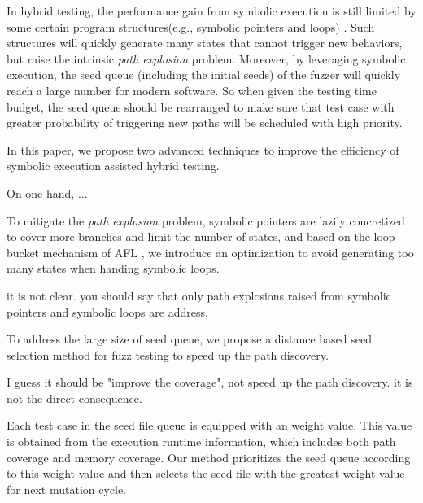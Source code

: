 {\color{blue}{1: explain that in hybrid testing, software is not taken as a gray box.
 2: explain what CGC is, give the full name. 3: are there some other hybrid testing? 
 why do you say symbolic execution assisted? 4: say that hybrid testing is a successful technqiue 
 that is used in practice, and this is witnessed by the tool Driller, also give the citation. } }

In hybrid testing, the performance gain from symbolic execution is still limited 
 by some certain program structures(e.g., symbolic pointers and loops) \cite{schwartz2010all, Boonstoppel:RAP, cadar2011symbolic, baldoni2016survey}. 
 Such structures will quickly generate many states that cannot trigger new behaviors,
 but raise the intrinsic \textit{path explosion} problem.
 Moreover, by leveraging symbolic execution, 
 the seed queue (including the initial seeds) of the fuzzer will quickly reach a large number for modern software. 
 So when given the testing time budget, the seed queue should be rearranged to make sure 
 that test case with greater probability of triggering new paths will be scheduled with high priority.


 In this paper, we propose two advanced techniques to improve the efficiency of symbolic execution assisted hybrid testing.

{\color{blue} {On one hand, ...}}

 To mitigate the \textit{path explosion} problem, symbolic pointers are lazily concretized to cover more branches and limit the number of states,
 and based on the loop bucket mechanism of AFL \cite{online:afl}, 
 we introduce an optimization to avoid generating too many states when handing symbolic loops. 

{\color{blue} {it is not clear. you should say that only path explosions raised from symbolic pointers 
 and symbolic loops are address.}}

{\color{blue}{On another hand, ... }}

 To address the large size of seed queue, 
 we propose a distance based seed selection method for fuzz testing to speed up the path discovery. 

 {\color{blue} I guess it should be "improve the coverage", not speed up the path discovery.
 it is not the direct consequence.}

 Each test case in the seed file queue is equipped with an weight value.
 This value is obtained from the execution runtime information,
 which includes both path coverage and memory coverage.
 Our method prioritizes the seed queue according to this weight value and 
 then selects the seed file with the greatest weight value for next mutation cycle.



